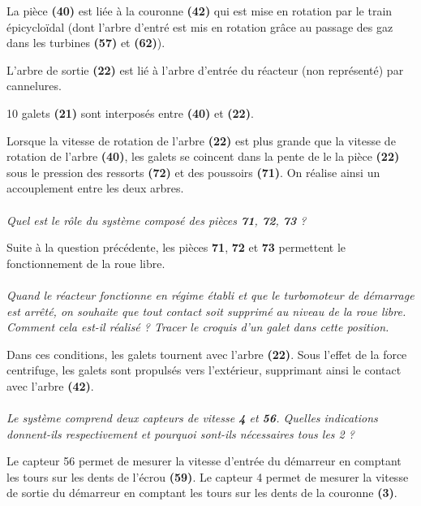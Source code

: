 \documentclass[11pt,oneside]{article}
\begin{document}
La pièce \textbf{(40)} est liée à la couronne \textbf{(42)} qui est mise en rotation par le train épicycloïdal (dont l'arbre d'entré est mis en rotation grâce au passage des gaz dans les turbines \textbf{(57)} et \textbf{(62)}). 

L'arbre de sortie \textbf{(22)} est lié à l'arbre d'entrée du réacteur (non représenté) par cannelures.

10 galets \textbf{(21)} sont interposés entre \textbf{(40)}  et \textbf{(22)}. 

Lorsque la vitesse de rotation de l'arbre \textbf{(22)} est plus grande que la vitesse de rotation de l'arbre \textbf{(40)}, les galets se coincent dans la pente de le la pièce \textbf{(22)} sous le pression des ressorts \textbf{(72)} et des poussoirs \textbf{(71)}. On
 réalise ainsi un accouplement entre les deux arbres. 

\paragraph{}
\textit{Quel est le rôle du système composé des pièces \textbf{71}, \textbf{72}, \textbf{73} ?}

Suite à la question précédente, les pièces \textbf{71}, \textbf{72} et \textbf{73} permettent le fonctionnement de la roue libre. 




\paragraph{}
\textit{Quand le réacteur fonctionne en régime établi et que le turbomoteur de démarrage est arrêté, on souhaite que tout contact soit supprimé au niveau de la roue libre. Comment cela est-il réalisé ? Tracer le croquis d'un galet dans cette position.}

Dans ces conditions, les galets tournent avec l'arbre  \textbf{(22)}. Sous l'effet de la force centrifuge, les galets sont propulsés vers l'extérieur, supprimant ainsi le contact avec l'arbre  \textbf{(42)}.

\paragraph{}
\textit{Le système comprend deux capteurs de vitesse \textbf{4} et \textbf{56}. Quelles indications donnent-ils respectivement et pourquoi sont-ils nécessaires tous les 2 ?}

Le capteur 56 permet de mesurer la vitesse d'entrée du démarreur en comptant les tours sur les dents de l'écrou  \textbf{(59)}. 
Le capteur 4 permet de mesurer la vitesse de sortie du démarreur en comptant les tours sur les dents de la couronne \textbf{(3)}. 
\end{document}
